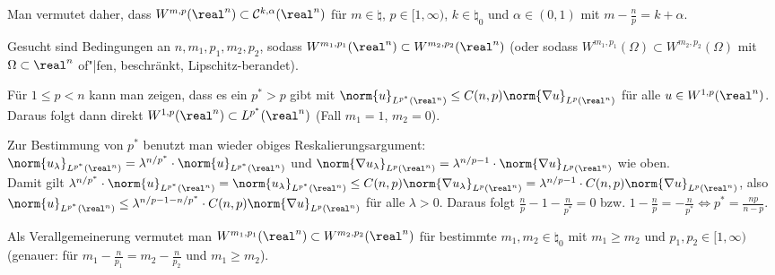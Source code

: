 \begin{Bem}
    Man vermutet daher, dass
    $W^{m,p}(\real^n) \subset \C^{k,\alpha}(\real^n)$
    für $m \in \natural$, $p \in [1, \infty)$, $k \in \natural_0$ und $\alpha \in (0, 1)$
    mit $m - \frac{n}{p} = k + \alpha$.
\end{Bem}

\linie
\pagebreak

\begin{Bem}
    Gesucht sind Bedingungen an $n, m_1, p_1, m_2, p_2$, sodass
    $W^{m_1,p_1}(\real^n) \subset W^{m_2,p_2}(\real^n)$
    (oder sodass $W^{m_1,p_1}(\Omega) \subset W^{m_2,p_2}(\Omega)$
    mit $\Omega \subset \real^n$ of"|fen, beschränkt, Lipschitz-berandet).

    Für $1 \le p < n$ kann man zeigen, dass es ein $p^\ast > p$ gibt mit
    $\norm{u}_{L^{p^\ast}(\real^n)} \le C(n,p) \norm{\nabla u}_{L^p(\real^n)}$
    für alle $u \in W^{1,p}(\real^n)$.
    Daraus folgt dann direkt $W^{1,p}(\real^n) \subset L^{p^\ast}(\real^n)$
    (Fall $m_1 = 1$, $m_2 = 0$).

    Zur Bestimmung von $p^\ast$ benutzt man wieder obiges Reskalierungsargument:\\
    $\norm{u_\lambda}_{L^{p^\ast}(\real^n)} =
    \lambda^{n/p^\ast} \cdot \norm{u}_{L^{p^\ast}(\real^n)}$
    und $\norm{\nabla u_\lambda}_{L^p(\real^n)} =
    \lambda^{n/p-1} \cdot \norm{\nabla u}_{L^p(\real^n)}$ wie oben.\\
    Damit gilt $\lambda^{n/p^\ast} \cdot \norm{u}_{L^{p^\ast}(\real^n)} =
    \norm{u_\lambda}_{L^{p^\ast}(\real^n)}
    \le C(n,p) \norm{\nabla u_\lambda}_{L^p(\real^n)} =
    \lambda^{n/p-1} \cdot C(n,p) \norm{\nabla u}_{L^p(\real^n)}$,
    also $\norm{u}_{L^{p^\ast}(\real^n)} \le
    \lambda^{n/p-1-n/p^\ast} \cdot C(n,p) \norm{\nabla u}_{L^p(\real^n)}$
    für alle $\lambda > 0$.
    Daraus folgt $\frac{n}{p} - 1 - \frac{n}{p^\ast} = 0$ bzw.
    $1 - \frac{n}{p} = -\frac{n}{p^\ast} \iff p^\ast = \frac{np}{n - p}$.

    Als Verallgemeinerung vermutet man $W^{m_1,p_1}(\real^n) \subset W^{m_2,p_2}(\real^n)$ für
    bestimmte $m_1, m_2 \in \natural_0$ mit $m_1 \ge m_2$ und $p_1, p_2 \in [1, \infty)$
    (genauer: für $m_1 - \frac{n}{p_1} = m_2 - \frac{n}{p_2}$ und $m_1 \ge m_2$).
\end{Bem}

\linie


